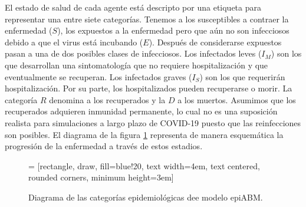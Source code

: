 El estado de salud de cada agente está descripto por una etiqueta para representar una entre siete categorías. Tenemos a los susceptibles a contraer la enfermedad ($S$), los expuestos a la enfermedad pero que aún no son infecciosos debido a que el virus está incubando ($E$). Después de considerarse expuestos pasan a una de dos posibles clases de infecciosos. Los infectados leves ($I_M$) son los que desarrollan una sintomatología que no requiere hospitalización y que eventualmente se recuperan. Los infectados graves ($I_S$) son los que requerirán hospitalización. Por su parte, los hospitalizados pueden recuperarse o morir. La categoría $R$ denomina a los recuperados y la $D$ a los muertos. Asumimos que los recuperados adquieren inmunidad permanente, lo cual no es una suposición realista para simulaciones a largo plazo de COVID-19 puesto que las reinfecciones son posibles. El diagrama de la figura \ref{dia:epi_abm} representa de manera esquemática la progresión de la enfermedad a través de estos estadios.

\begin{figure}
    \begin{center}
         = [rectangle, draw, fill=blue!20, 
        text width=4em, text centered, rounded corners, minimum height=3em]
        \centering
    \end{center}
    \caption{Diagrama de las categorías epidemiológicas dee modelo epiABM.}
    \label{dia:epi_abm}
\end{figure}

